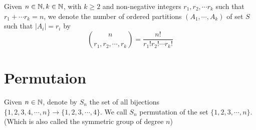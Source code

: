 \documentclass[12pt]{article}
\begin{document}
\begin{definition}
	Given $n\in \mathbb{N}, k \in \mathbb{N}$, with $k \geq 2$ and non-negative integers $r_1, r_2, \cdots r_k$ such that $r_1+\cdots r_k=n$, we denote the number of ordered partitions $(A_1, \cdots, A_k)$ of set $S$ such that $|A_i|=r_i$ by 
	\[ 
		\binom{n}{r_1, r_2, \cdots, r_k} = \frac{n!}{r_1!r_2!\cdots r_k!}
	\] 
\end{definition}

\section{Permutaion}

\begin{definition}
	Given $n \in \mathbb{N}$, denote by $S_n$ the set of all bijections $\{1,2,3,4, \cdots,n\} \rightarrow \{1,2,3, \cdots, 4\}$. We call $S_n$ permutation of the set $\{1,2,3,\cdots,n\}$. (Which is also called the symmetric group of degree $n$)
\end{definition}
\end{document}
